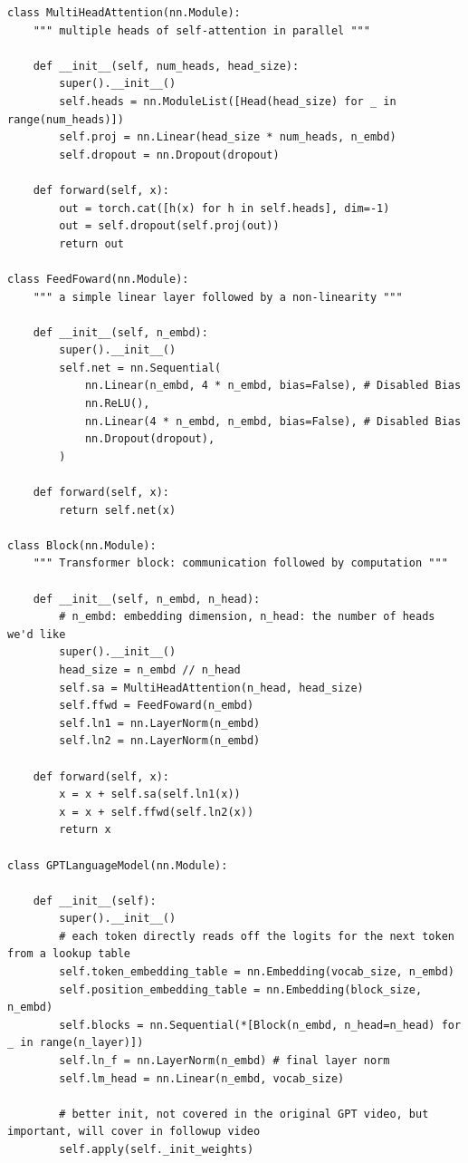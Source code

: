 \begin{verbatim}
class MultiHeadAttention(nn.Module):
    """ multiple heads of self-attention in parallel """

    def __init__(self, num_heads, head_size):
        super().__init__()
        self.heads = nn.ModuleList([Head(head_size) for _ in range(num_heads)])
        self.proj = nn.Linear(head_size * num_heads, n_embd)
        self.dropout = nn.Dropout(dropout)

    def forward(self, x):
        out = torch.cat([h(x) for h in self.heads], dim=-1)
        out = self.dropout(self.proj(out))
        return out

class FeedFoward(nn.Module):
    """ a simple linear layer followed by a non-linearity """

    def __init__(self, n_embd):
        super().__init__()
        self.net = nn.Sequential(
            nn.Linear(n_embd, 4 * n_embd, bias=False), # Disabled Bias
            nn.ReLU(),
            nn.Linear(4 * n_embd, n_embd, bias=False), # Disabled Bias
            nn.Dropout(dropout),
        )

    def forward(self, x):
        return self.net(x)

class Block(nn.Module):
    """ Transformer block: communication followed by computation """

    def __init__(self, n_embd, n_head):
        # n_embd: embedding dimension, n_head: the number of heads we'd like
        super().__init__()
        head_size = n_embd // n_head
        self.sa = MultiHeadAttention(n_head, head_size)
        self.ffwd = FeedFoward(n_embd)
        self.ln1 = nn.LayerNorm(n_embd)
        self.ln2 = nn.LayerNorm(n_embd)

    def forward(self, x):
        x = x + self.sa(self.ln1(x))
        x = x + self.ffwd(self.ln2(x))
        return x

class GPTLanguageModel(nn.Module):

    def __init__(self):
        super().__init__()
        # each token directly reads off the logits for the next token from a lookup table
        self.token_embedding_table = nn.Embedding(vocab_size, n_embd)
        self.position_embedding_table = nn.Embedding(block_size, n_embd)
        self.blocks = nn.Sequential(*[Block(n_embd, n_head=n_head) for _ in range(n_layer)])
        self.ln_f = nn.LayerNorm(n_embd) # final layer norm
        self.lm_head = nn.Linear(n_embd, vocab_size)

        # better init, not covered in the original GPT video, but important, will cover in followup video
        self.apply(self._init_weights)


\end{verbatim}
